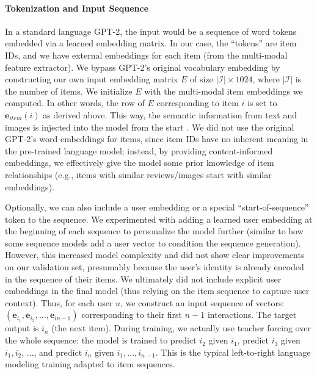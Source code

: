 \documentclass[conference]{IEEEtran}
\begin{document}
\paragraph{Tokenization and Input Sequence} In a standard language GPT-2, the input would be a sequence of word tokens embedded via a learned embedding matrix. In our case, the “tokens” are item IDs, and we have external embeddings for each item (from the multi-modal feature extractor). We bypass GPT-2’s original vocabulary embedding by constructing our own input embedding matrix $E$ of size $|\mathcal{I}|\times 1024$, where $|\mathcal{I}|$ is the number of items. We initialize $E$ with the multi-modal item embeddings we computed. In other words, the row of $E$ corresponding to item $i$ is set to $\mathbf{e}_{item}(i)$ as derived above. This way, the semantic information from text and images is injected into the model from the start \cite{b5}. We did not use the original GPT-2’s word embeddings for items, since item IDs have no inherent meaning in the pre-trained language model; instead, by providing content-informed embeddings, we effectively give the model some prior knowledge of item relationships (e.g., items with similar reviews/images start with similar embeddings).

Optionally, we can also include a user embedding or a special “start-of-sequence” token to the sequence. We experimented with adding a learned user embedding at the beginning of each sequence to personalize the model further (similar to how some sequence models add a user vector to condition the sequence generation). However, this increased model complexity and did not show clear improvements on our validation set, presumably because the user’s identity is already encoded in the sequence of their items. We ultimately did not include explicit user embeddings in the final model (thus relying on the item sequence to capture user context). Thus, for each user $u$, we construct an input sequence of vectors: $(\mathbf{e}_{i_1}, \mathbf{e}_{i_2}, ..., \mathbf{e}_{i{n-1}})$ corresponding to their first $n-1$ interactions. The target output is $i_n$ (the next item). During training, we actually use teacher forcing over the whole sequence: the model is trained to predict $i_{2}$ given $i_{1}$, predict $i_{3}$ given $i_{1},i_{2}$, ..., and predict $i_n$ given $i_{1},...,i_{n-1}$. This is the typical left-to-right language modeling training adapted to item sequences. 
\end{document}
